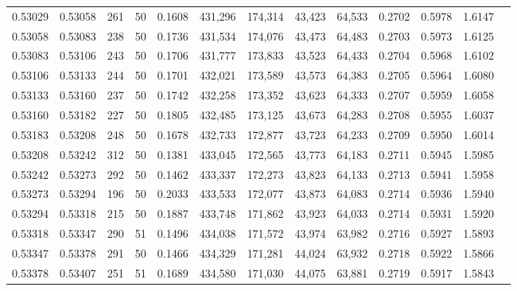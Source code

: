 \begin{tabular}{rrrrrrrrrrrrr}
0.53029 & 0.53058 &   261 &  50 &                                     0.1608 & 431,296 & 174,314 &  43,423 &  64,533 & 0.2702 & 0.5978 & 1.6147 \\
0.53058 & 0.53083 &   238 &  50 &                                     0.1736 & 431,534 & 174,076 &  43,473 &  64,483 & 0.2703 & 0.5973 & 1.6125 \\
0.53083 & 0.53106 &   243 &  50 &                                     0.1706 & 431,777 & 173,833 &  43,523 &  64,433 & 0.2704 & 0.5968 & 1.6102 \\
0.53106 & 0.53133 &   244 &  50 &                                     0.1701 & 432,021 & 173,589 &  43,573 &  64,383 & 0.2705 & 0.5964 & 1.6080 \\
0.53133 & 0.53160 &   237 &  50 &                                     0.1742 & 432,258 & 173,352 &  43,623 &  64,333 & 0.2707 & 0.5959 & 1.6058 \\
0.53160 & 0.53182 &   227 &  50 &                                     0.1805 & 432,485 & 173,125 &  43,673 &  64,283 & 0.2708 & 0.5955 & 1.6037 \\
0.53183 & 0.53208 &   248 &  50 &                                     0.1678 & 432,733 & 172,877 &  43,723 &  64,233 & 0.2709 & 0.5950 & 1.6014 \\
0.53208 & 0.53242 &   312 &  50 &                                     0.1381 & 433,045 & 172,565 &  43,773 &  64,183 & 0.2711 & 0.5945 & 1.5985 \\
0.53242 & 0.53273 &   292 &  50 &                                     0.1462 & 433,337 & 172,273 &  43,823 &  64,133 & 0.2713 & 0.5941 & 1.5958 \\
0.53273 & 0.53294 &   196 &  50 &                                     0.2033 & 433,533 & 172,077 &  43,873 &  64,083 & 0.2714 & 0.5936 & 1.5940 \\
0.53294 & 0.53318 &   215 &  50 &                                     0.1887 & 433,748 & 171,862 &  43,923 &  64,033 & 0.2714 & 0.5931 & 1.5920 \\
0.53318 & 0.53347 &   290 &  51 &                                     0.1496 & 434,038 & 171,572 &  43,974 &  63,982 & 0.2716 & 0.5927 & 1.5893 \\
0.53347 & 0.53378 &   291 &  50 &                                     0.1466 & 434,329 & 171,281 &  44,024 &  63,932 & 0.2718 & 0.5922 & 1.5866 \\
0.53378 & 0.53407 &   251 &  51 &                                     0.1689 & 434,580 & 171,030 &  44,075 &  63,881 & 0.2719 & 0.5917 & 1.5843 \\

\end{tabular}
